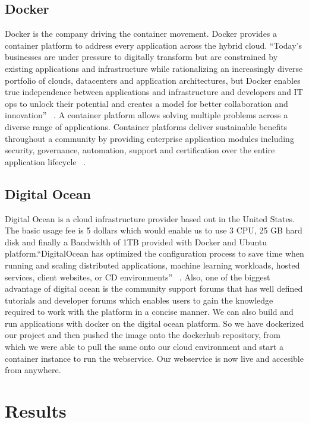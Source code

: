 \subsection{Docker}
Docker is the company driving the container movement. Docker provides a 
container platform to address every application across the hybrid cloud. 
``Today’s businesses are under pressure to digitally transform but are 
constrained by existing applications and infrastructure while 
rationalizing an increasingly diverse portfolio of clouds, datacenters 
and application architectures, but Docker enables true 
independence between applications and infrastructure and developers 
and IT ops to unlock their potential and creates a model for better collaboration 
and innovation'' ~\cite{hid-sp18-418-docker}. A container platform allows solving 
multiple problems across a diverse range of applications. Container platforms 
deliver sustainable benefits throughout a community by providing enterprise 
application modules including security, governance, automation, support and 
certification over the entire application lifecycle ~\cite{hid-sp18-418-docker}.

\subsection{Digital Ocean}
Digital Ocean is a cloud infrastructure provider based out in the 
United States. The basic usage fee is 5 dollars which would enable us to use 
3 CPU, 25 GB hard disk and finally a Bandwidth of 1TB provided with Docker and 
Ubuntu platform.``DigitalOcean has optimized the configuration process to save 
time when running and scaling distributed applications, machine learning 
workloads, hosted services, client websites, or CD environments'' 
~\cite{hid-sp18-418-digital-ocean}. Also, one of the biggest advantage 
of digital ocean is the community support forums that has well defined 
tutorials and developer forums which enables users to gain the knowledge 
required to work with the platform in a concise manner. We can also build 
and run applications with docker on the digital ocean platform. So we have 
dockerized our project and then pushed the image onto the dockerhub 
repository, from which we were able to pull the same onto our cloud environment 
and start a container instance to run the webservice. Our webservice is now 
live and accesible from anywhere.

\section{Results}

